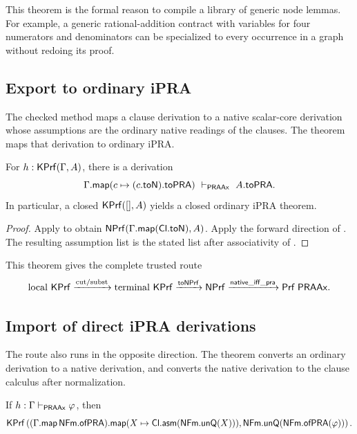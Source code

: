 This theorem is the formal reason to compile a library of generic node lemmas.
For example, a generic rational-addition contract with variables for four
numerators and denominators can be specialized to every occurrence in a graph
without redoing its proof.

\subsection{Export to ordinary iPRA}

The checked method  maps a clause derivation to a native
scalar-core derivation whose assumptions are the ordinary native readings of
the clauses.  The theorem  maps that derivation to ordinary
iPRA.

\begin{theorem}\label{thm:export}
For \(h:\mathsf{KPrf}(\Gamma,A)\), there is a derivation
\[
  \Gamma.\mathsf{map}(c\mapsto (c.\mathsf{toN}).\mathsf{toPRA})
  \ \vdash_{\mathsf{PRAAx}}\ A.\mathsf{toPRA}.
\]
In particular, a closed \(\mathsf{KPrf}([],A)\) yields a closed ordinary iPRA theorem.
\end{theorem}

\begin{proof}
Apply  to obtain
\(\mathsf{NPrf}(\Gamma.\mathsf{map}(\mathsf{Cl}.\mathsf{toN}),A)\).  Apply the forward
direction of .  The resulting assumption list is the
stated list after associativity of .
\end{proof}

This theorem gives the complete trusted route
\[
  \text{local }\mathsf{KPrf}
   \xrightarrow{\text{cut/subst}}
  \text{terminal }\mathsf{KPrf}
   \xrightarrow{\mathsf{toNPrf}}
  \mathsf{NPrf}
   \xrightarrow{\mathsf{native\_iff\_pra}}
  \mathsf{Prf}\;\mathsf{PRAAx}.
\]

\subsection{Import of direct iPRA derivations}

The route also runs in the opposite direction.  The theorem
 converts an ordinary derivation to a native derivation,
and  converts the native derivation to the clause calculus
after  normalization.

\begin{theorem}\label{thm:import}
If \(h:\Gamma\vdash_{\mathsf{PRAAx}}\varphi\), then
\[
 \mathsf{KPrf}\left(
  (\Gamma.\mathsf{map}\,\mathsf{NFm}.\mathsf{ofPRA}).
      \mathsf{map}(X\mapsto\mathsf{Cl}.\mathsf{asm}(\mathsf{NFm}.\mathsf{unQ}(X))),
  \mathsf{NFm}.\mathsf{unQ}(\mathsf{NFm}.\mathsf{ofPRA}(\varphi))\right).
\]
\end{theorem}

